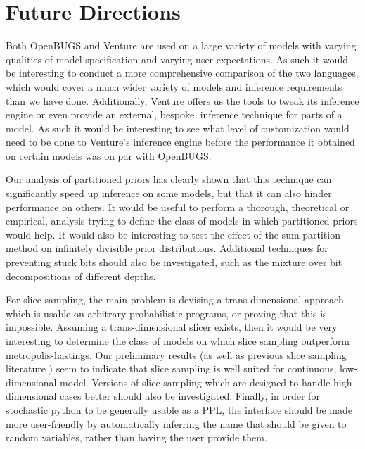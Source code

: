 \section{Future Directions}
Both OpenBUGS and Venture are used on a large variety of models with varying qualities of model specification and varying user expectations. As such it would be interesting to conduct a more comprehensive comparison of the two languages, which would cover a much wider variety of models and inference requirements than we have done. Additionally, Venture offers us the tools to tweak its inference engine or even provide an external, bespoke, inference technique for parts of a model. As such it would be interesting to see what level of customization would need to be done to Venture's inference engine before the performance it obtained on certain models was on par with OpenBUGS.

Our analysis of partitioned priors has clearly shown that this technique can significantly speed up inference on some models, but that it can also hinder performance on others. It would be useful to perform a thorough, theoretical or empirical, analysis trying to define the class of models in which partitioned priors would help. It would also be interesting to test the effect of the sum partition method on infinitely divisible prior distributions. Additional techniques for preventing stuck bits should also be investigated, such as the mixture over bit decompositions of different depths. 

For slice sampling, the main problem is devising a trans-dimensional approach which is usable on arbitrary probabilistic programs, or proving that this is impossible. Assuming a trans-dimensional slicer exists, then it would be very interesting to determine the class of models on which slice sampling outperform metropolis-hastings. Our preliminary results (as well as previous slice sampling literature \cite{}) seem to indicate that slice sampling is well suited for continuous, low-dimensional model. Versions of slice sampling which are designed to handle high-dimensional cases better should also be investigated. Finally, in order for stochastic python to be generally usable as a PPL, the interface should be made more user-friendly by automatically inferring the name that should be given to random variables, rather than having the user provide them.


